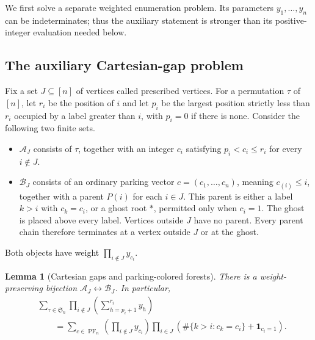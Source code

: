 \documentclass[11pt,a4paper]{article}
\newtheorem{lemma}[theorem]{Lemma}
\theoremstyle{definition}
\theoremstyle{remark}
\begin{document}
We first solve a separate weighted enumeration problem. Its parameters
$y_1,\ldots,y_n$ can be indeterminates; thus the auxiliary statement is
stronger than its positive-integer evaluation needed below.

\subsection{The auxiliary Cartesian-gap problem}

Fix a set $J\subseteq[n]$ of vertices called prescribed vertices. For a
permutation $\tau$ of $[n]$, let $r_i$ be the position of $i$ and let $p_i$
be the largest position strictly less than $r_i$ occupied by a label
greater than $i$, with $p_i=0$ if there is none. Consider the following two
finite sets.

\begin{itemize}
\item $\mathcal A_J$ consists of $\tau$, together with an integer $c_i$
      satisfying $p_i<c_i\le r_i$ for every $i\notin J$.
\item $\mathcal B_J$ consists of an ordinary parking vector
      $c=(c_1,\ldots,c_n)$, meaning $c_{(i)}\le i$, together with a parent
      $P(i)$ for each $i\in J$. This parent is either a label $k>i$ with
      $c_k=c_i$, or a ghost root $*$, permitted only when $c_i=1$.
      The ghost is placed above every label. Vertices outside $J$ have no
      parent. Every parent chain therefore terminates at a vertex outside
      $J$ or at the ghost.
\end{itemize}

Both objects have weight $\prod_{i\notin J}y_{c_i}$.

\begin{lemma}[Cartesian gaps and parking-colored forests]
There is a weight-preserving bijection $\mathcal A_J\longleftrightarrow
\mathcal B_J$. In particular,
\begin{align}
 &\sum_{\tau\in\mathfrak S_n}
       \prod_{i\notin J}\left(\sum_{h=p_i+1}^{r_i}y_h\right)\label{eq:t91gap}\\
 &\qquad=
 \sum_{c\in\operatorname{PF}_n}
    \left(\prod_{i\notin J}y_{c_i}\right)
    \prod_{i\in J}
       \left(\#\{k>i:c_k=c_i\}+\mathbf1_{c_i=1}\right).\nonumber
\end{align}
\end{lemma}
\end{document}
